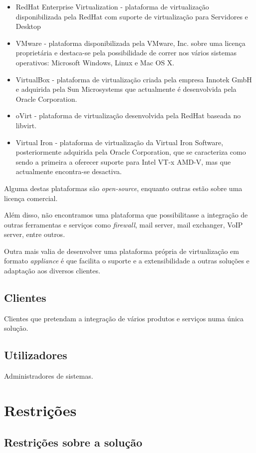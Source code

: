 \documentclass[a4paper,11pt,titlepage]{article}
\begin{document}
\begin{itemize}
    \item RedHat Enterprise Virtualization - plataforma de virtualização disponibilizada pela RedHat com suporte de virtualização para Servidores e Desktop
    \item VMware - plataforma disponibilizada pela VMware, Inc. sobre uma licença proprietária e destaca-se pela possibilidade de correr nos vários sistemas operativos: Microsoft Windows, Linux e Mac OS X.
    \item VirtualBox - plataforma de virtualização criada pela empresa Innotek GmbH e adquirida pela Sun Microsystems que actualmente é desenvolvida pela Oracle Corporation.
    \item oVirt - plataforma de virtualização desenvolvida pela RedHat baseada no libvirt.
    \item Virtual Iron - plataforma de virtualização da Virtual Iron Software, posteriormente adquirida pela Oracle Corporation, que se caracteriza como sendo a primeira a oferecer suporte para Intel VT-x AMD-V, mas que actualmente encontra-se desactiva.
\end{itemize}

Alguma destas plataformas são \emph{open-source}, enquanto outras estão sobre uma licença comercial.

Além disso, não encontramos uma plataforma que possibilitasse a integração de outras ferramentas e serviços como \emph{firewall}, mail server, mail exchanger, VoIP server, entre outros.

Outra mais valia de desenvolver uma plataforma própria de virtualização em formato \emph{appliance} é que facilita o suporte e a extensibilidade a outras soluções e adaptação aos diversos clientes.

\subsection{Clientes}
Clientes que pretendam a integração de vários produtos e serviços numa única solução.
\subsection{Utilizadores}
Administradores de sistemas.

\section{Restrições}
\subsection{Restrições sobre a solução}
\end{document}
